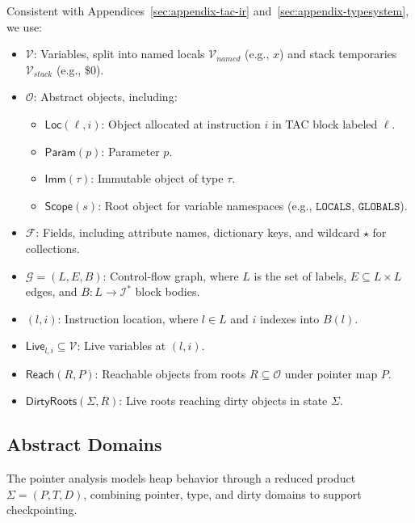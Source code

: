 Consistent with Appendices~\ref{sec:appendix-tac-ir} and~\ref{sec:appendix-typesystem}, we use:
\begin{itemize}
    \item \(\mathcal{V}\): Variables, split into named locals \(\mathcal{V}_{\mathit{named}}\) (e.g., \(x\)) and stack temporaries \(\mathcal{V}_{\mathit{stack}}\) (e.g., \(\$0\)).
    \item \(\mathcal{O}\): Abstract objects, including:
    \begin{itemize}
        \item \(\mathsf{Loc}(\ell,i)\): Object allocated at instruction \(i\) in TAC block labeled \(\ell\).
        \item \(\mathsf{Param}(p)\): Parameter \(p\).
        \item \(\mathsf{Imm}(\tau)\): Immutable object of type \(\tau\).
        \item \(\mathsf{Scope}(s)\): Root object for variable namespaces (e.g., \(\mathtt{LOCALS}\), \(\mathtt{GLOBALS}\)).
    \end{itemize}
    \item \(\mathcal{F}\): Fields, including attribute names, dictionary keys, and wildcard \(\star\) for collections.
    \item \(\mathcal{G} = (L, E, B)\): Control-flow graph, where \(L\) is the set of labels, \(E \subseteq L \times L\) edges, and \(B: L \to \mathcal{I}^*\) block bodies.
    \item \((l, i)\): Instruction location, where \(l \in L\) and \(i\) indexes into \(B(l)\).
    \item \(\mathsf{Live}_{l,i} \subseteq \mathcal{V}\): Live variables at \((l,i)\).
    \item \(\mathsf{Reach}(R, P)\): Reachable objects from roots \(R \subseteq \mathcal{O}\) under pointer map \(P\).
    \item \(\mathsf{DirtyRoots}(\Sigma, R)\): Live roots reaching dirty objects in state \(\Sigma\).
\end{itemize}

\subsection{Abstract Domains}

The pointer analysis models heap behavior through a reduced product \(\Sigma = (P, T, D)\), combining pointer, type, and dirty domains to support checkpointing.

